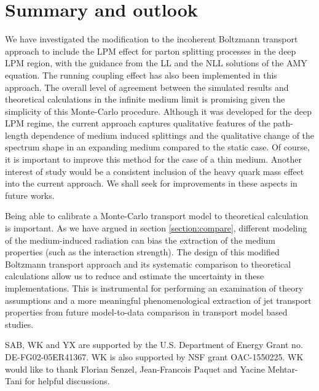 \documentclass[aps, prc, reprint, amsmath, groupedaddress, nofootinbib]{revtex4-1}
\begin{document}
\section{Summary and outlook}\label{section:summary}
We have investigated the modification to the incoherent Boltzmann transport approach to include the LPM effect for parton splitting processes in the deep LPM region, with the guidance from the LL and the NLL solutions of the AMY equation.
The running coupling effect has also been implemented in this approach.
The overall level of agreement between the simulated results and theoretical calculations in the infinite medium limit is promising given the simplicity of this Monte-Carlo procedure. 
Although it was developed for the deep LPM regime, the current approach captures qualitative features of the path-length dependence of medium induced splittings and the qualitative change of the spectrum shape in an expanding medium compared to the static case.
Of course, it is important to improve this method for the case of a thin medium.
Another interest of study would be a consistent inclusion of the heavy quark mass effect into the current approach.
We shall seek for improvements in these aspects in future works.

Being able to calibrate a Monte-Carlo transport model to theoretical calculation is important.
As we have argued in section \ref{section:compare}, different modeling of the medium-induced radiation can bias the extraction of the medium properties (such as the interaction strength).
The design of this modified Boltzmann transport approach and its systematic comparison to theoretical calculations allow us to reduce and estimate the uncertainty in these implementations.
This is instrumental for performing an examination of theory assumptions and a more meaningful phenomenological extraction of jet transport properties from future model-to-data comparison in transport model based studies.

\begin{acknowledgments}
SAB, WK and YX are supported by the U.S. Department of Energy Grant no. DE-FG02-05ER41367. WK is also supported by NSF grant OAC-1550225.
WK would like to thank Florian Senzel, Jean-Francois Paquet and Yacine Mehtar-Tani for helpful discussions.
\end{acknowledgments}
\end{document}
